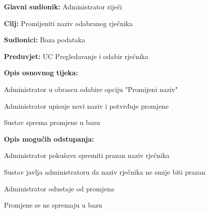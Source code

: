 \noindent {}
\begin{packed_item}

	\item \textbf{Glavni sudionik: } Administrator riječi
	\item \textbf{Cilj: } Promijeniti naziv odabranog rječnika
	\item \textbf{Sudionici: } Baza podataka
	\item \textbf{Preduvjet: } UC Pregledavanje i odabir rječnika
	\item  \textbf{Opis osnovnog tijeka:}
	
	\item[] \begin{packed_enum}
		
		\item Administrator u obrascu odabire opciju "Promijeni naziv"
		\item Administrator upisuje novi naziv i potvrđuje promjene
		\item Sustav sprema promjene u bazu

	\end{packed_enum}

	\item  \textbf{Opis mogućih odstupanja:}
	
	\item[] \begin{packed_item}

		\item[2.a] Administrator pokušava spremiti prazan naziv rječnika
		\item[] \begin{packed_enum}
			
			\item Sustav javlja administratoru da naziv rječnika ne smije biti prazan
			
		\end{packed_enum}

		\item[2.b] Administrator odustaje od promjena
		\item[] \begin{packed_enum}
			
			\item Promjene se ne spremaju u bazu
			
		\end{packed_enum}
		
	\end{packed_item}

\end{packed_item}

